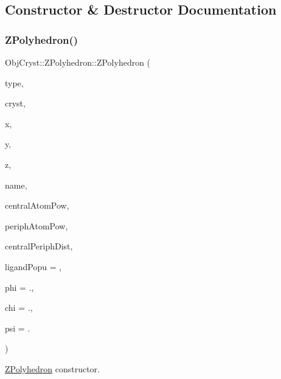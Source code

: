 \subsection{Constructor \& Destructor Documentation}
\mbox{\label{class_obj_cryst_1_1_z_polyhedron_a624314fc85edd2b27e572e33c1487bed}} 
\subsubsection{\texorpdfstring{ZPolyhedron()}{ZPolyhedron()}}
{\footnotesize\ttfamily Obj\+Cryst\+::\+Z\+Polyhedron\+::\+Z\+Polyhedron (\begin{DoxyParamCaption}\item[{const Regular\+Polyhedra\+Type}]{type,  }\item[{\mbox{\hyperlink{class_obj_cryst_1_1_crystal}{Crystal}} \&}]{cryst,  }\item[{const R\+E\+AL}]{x,  }\item[{const R\+E\+AL}]{y,  }\item[{const R\+E\+AL}]{z,  }\item[{const string \&}]{name,  }\item[{const \mbox{\hyperlink{class_obj_cryst_1_1_scattering_power}{Scattering\+Power}} $\ast$}]{central\+Atom\+Pow,  }\item[{const \mbox{\hyperlink{class_obj_cryst_1_1_scattering_power}{Scattering\+Power}} $\ast$}]{periph\+Atom\+Pow,  }\item[{const R\+E\+AL}]{central\+Periph\+Dist,  }\item[{const R\+E\+AL}]{ligand\+Popu = {},  }\item[{const R\+E\+AL}]{phi = {.},  }\item[{const R\+E\+AL}]{chi = {.},  }\item[{const R\+E\+AL}]{psi = {.} }\end{DoxyParamCaption})}



\mbox{\hyperlink{class_obj_cryst_1_1_z_polyhedron}{Z\+Polyhedron}} constructor. 



